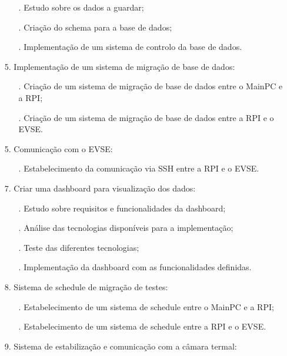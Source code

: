 \begin{itemize}
        \begin{itemize}
            \item[.] Estudo sobre os dados a guardar;
            \item[.] Criação do schema para a base de dados;
            \item[.] Implementação de um sistema de controlo da base de dados.
        \end{itemize}
    \item[] 5. Implementação de um sistema de migração de base de dados:
        \begin{itemize}
            \item [.] Criação de um sistema de migração de base de dados entre o MainPC e a RPI;
            \item [.] Criação de um sistema de migração de base de dados entre a RPI e o EVSE.
        \end{itemize}
    \item[] 5. Comunicação com o EVSE:
        \begin{itemize}
            \item[.] Estabelecimento da comunicação via SSH entre a RPI e o EVSE.
        \end{itemize}
    \item[] 7. Criar uma dashboard para visualização dos dados:
        \begin{itemize}
            \item[.] Estudo sobre requisitos e funcionalidades da dashboard;
            \item[.] Análise das tecnologias disponíveis para a implementação;
            \item[.] Teste das diferentes tecnologias;
            \item[.] Implementação da dashboard com as funcionalidades definidas.
        \end{itemize}
    \item[] 8. Sistema de schedule de migração de testes: 
        \begin{itemize}
            \item[.] Estabelecimento de um sistema de schedule entre o MainPC e a RPI;
            \item[.] Estabelecimento de um sistema de schedule entre a RPI e o EVSE.
        \end{itemize}
    \item[] 9. Sistema de estabilização e comunicação com a câmara termal:
        \begin{itemize}

\end{itemize}
\end{itemize}
